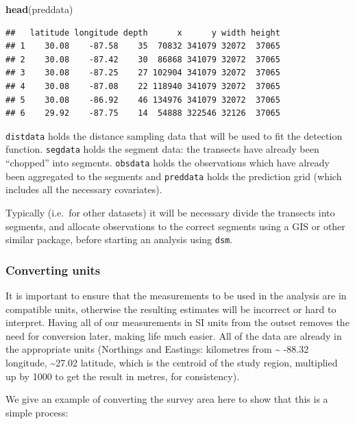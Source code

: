 \documentclass[]{article}
\newenvironment{Shaded}{}{}
\newcommand{\KeywordTok}[1]{\textcolor[rgb]{0.00,0.44,0.13}{\textbf{{#1}}}}
\newcommand{\NormalTok}[1]{{#1}}
\begin{document}
\begin{Shaded}
\begin{Highlighting}[]
\KeywordTok{head}\NormalTok{(preddata)}
\end{Highlighting}
\end{Shaded}

\begin{verbatim}
##   latitude longitude depth      x      y width height
## 1    30.08    -87.58    35  70832 341079 32072  37065
## 2    30.08    -87.42    30  86868 341079 32072  37065
## 3    30.08    -87.25    27 102904 341079 32072  37065
## 4    30.08    -87.08    22 118940 341079 32072  37065
## 5    30.08    -86.92    46 134976 341079 32072  37065
## 6    29.92    -87.75    14  54888 322546 32126  37065
\end{verbatim}

\texttt{distdata} holds the distance sampling data that will be used to
fit the detection function. \texttt{segdata} holds the segment data: the
transects have already been ``chopped'' into segments. \texttt{obsdata}
holds the observations which have already been aggregated to the
segments and \texttt{preddata} holds the prediction grid (which includes
all the necessary covariates).

Typically (i.e.~for other datasets) it will be necessary divide the
transects into segments, and allocate observations to the correct
segments using a GIS or other similar package, before starting an
analysis using \texttt{dsm}.

\subsubsection{Converting units}\label{converting-units}

It is important to ensure that the measurements to be used in the
analysis are in compatible units, otherwise the resulting estimates will
be incorrect or hard to interpret. Having all of our measurements in SI
units from the outset removes the need for conversion later, making life
much easier. All of the data are already in the appropriate units
(Northings and Eastings: kilometres from \textasciitilde{} -88.32
longitude, \textasciitilde{}27.02 latitude, which is the centroid of the
study region, multiplied up by 1000 to get the result in metres, for
consistency).

We give an example of converting the survey area here to show that this
is a simple process:
\end{document}
